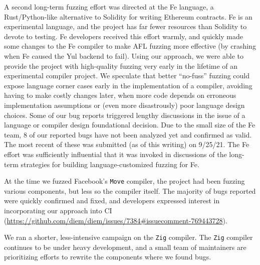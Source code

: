A second long-term fuzzing effort was directed at the Fe language, a Rust/Python-like alternative to Solidity for writing Ethereum contracts.  Fe is an experimental language, and the project has far fewer resources than Solidity to devote to testing.  Fe developers received this effort warmly, and quickly made some changes to the Fe compiler to make AFL fuzzing more effective (by crashing when Fe caused the Yul backend to fail).  Using our approach, we were able to provide the project with high-quality fuzzing very early in the lifetime of an experimental compiler project.  We speculate that better ``no-fuss'' fuzzing could expose language corner cases early in the implementation of a compiler, avoiding having to make costly changes later, when more code depends on erroneous implementation assumptions or (even more disastrously) poor language design choices.  Some of our bug reports triggered lengthy discussions in the issue of a language or compiler design foundational decision.  Due to the small size of the Fe team, 8 of our reported bugs have not been analyzed yet and confirmed as valid.  The most recent of these was submitted (as of this writing) on 9/25/21.  The Fe effort was sufficiently influential that it was invoked in discussions of the long-term strategies for building language-customized fuzzing for Fe.

At the time we fuzzed Facebook's \texttt{Move} compiler, the project had been fuzzing various components, but less so the compiler itself.
The majority of bugs reported were quickly confirmed and fixed, and developers expressed interest in incorporating our approach into CI (\url{https://github.com/diem/diem/issues/7384#issuecomment-769443728}).


We ran a shorter, less-intensive campaign on the \texttt{Zig} compiler.  The
\texttt{Zig} compiler continues to be under heavy development, and a small team
of maintainers are prioritizing efforts to rewrite the components where we found
bugs.
